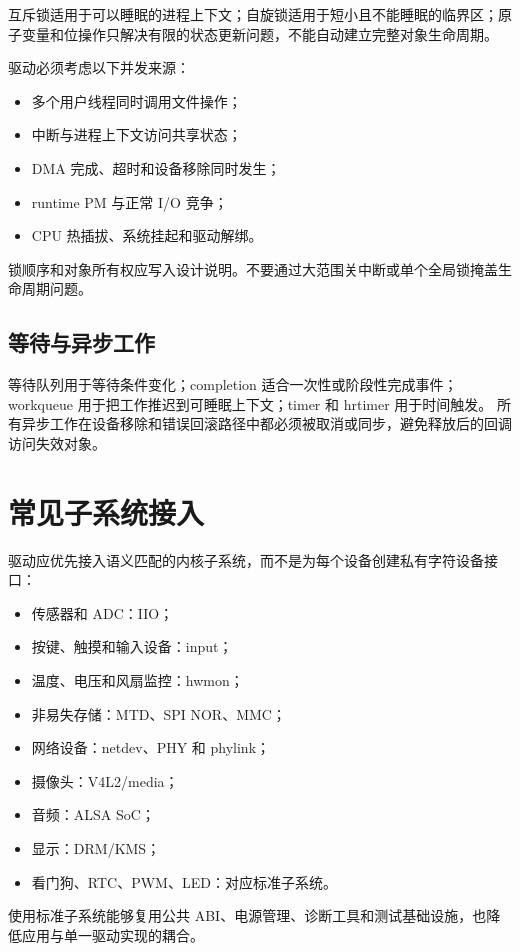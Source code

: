 互斥锁适用于可以睡眠的进程上下文；自旋锁适用于短小且不能睡眠的临界区；原子变量和位操作只解决有限的状态更新问题，不能自动建立完整对象生命周期。

驱动必须考虑以下并发来源：
\begin{itemize}
  \item 多个用户线程同时调用文件操作；
  \item 中断与进程上下文访问共享状态；
  \item DMA 完成、超时和设备移除同时发生；
  \item runtime PM 与正常 I/O 竞争；
  \item CPU 热插拔、系统挂起和驱动解绑。
\end{itemize}

锁顺序和对象所有权应写入设计说明。不要通过大范围关中断或单个全局锁掩盖生命周期问题。

\subsection{等待与异步工作}

等待队列用于等待条件变化；completion 适合一次性或阶段性完成事件；workqueue 用于把工作推迟到可睡眠上下文；timer 和 hrtimer 用于时间触发。
所有异步工作在设备移除和错误回滚路径中都必须被取消或同步，避免释放后的回调访问失效对象。

\section{常见子系统接入}

驱动应优先接入语义匹配的内核子系统，而不是为每个设备创建私有字符设备接口：
\begin{itemize}
  \item 传感器和 ADC：IIO；
  \item 按键、触摸和输入设备：input；
  \item 温度、电压和风扇监控：hwmon；
  \item 非易失存储：MTD、SPI NOR、MMC；
  \item 网络设备：netdev、PHY 和 phylink；
  \item 摄像头：V4L2/media；
  \item 音频：ALSA SoC；
  \item 显示：DRM/KMS；
  \item 看门狗、RTC、PWM、LED：对应标准子系统。
\end{itemize}

使用标准子系统能够复用公共 ABI、电源管理、诊断工具和测试基础设施，也降低应用与单一驱动实现的耦合。

